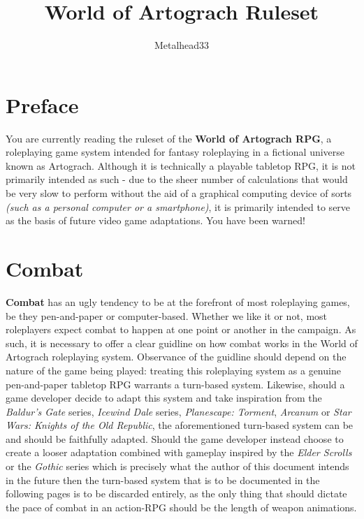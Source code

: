 \documentclass[openany,11pt,a4paper]{book}
\author{Metalhead33}
\title{World of Artograch Ruleset}
\begin{document}
\maketitle
\tableofcontents
\chapter*{Preface}
You are currently reading the ruleset of the \textbf{World of Artograch RPG}, a roleplaying game system intended for fantasy roleplaying in a fictional universe known as Artograch. Although it is technically a playable tabletop RPG, it is not primarily intended as such - due to the sheer number of calculations that would be very slow to perform without the aid of a graphical computing device of sorts \textit{(such as a personal computer or a smartphone)}, it is primarily intended to serve as the basis of future video game adaptations. You have been warned!\newline
\chapter{Combat}
\textbf{Combat} has an ugly tendency to be at the forefront of most roleplaying games, be they pen-and-paper or computer-based. Whether we like it or not, most roleplayers expect combat to happen at one point or another in the campaign. As such, it is necessary to offer a clear guidline on how combat works in the World of Artograch roleplaying system.\newline
Observance of the guidline should depend on the nature of the game being played: treating this roleplaying system as a genuine pen-and-paper tabletop RPG warrants a turn-based system. Likewise, should a game developer decide to adapt this system and take inspiration from the \textit{Baldur's Gate} series, \textit{Icewind Dale} series, \textit{Planescape: Torment}, \textit{Arcanum} or \textit{Star Wars: Knights of the Old Republic}, the aforementioned turn-based system can be and should be faithfully adapted. Should the game developer instead choose to create a looser adaptation combined with gameplay inspired by the \textit{Elder Scrolls} or the \textit{Gothic} series \textemdash which is precisely what the author of this document intends in the future \textemdash then the turn-based system that is to be documented in the following pages is to be discarded entirely, as the only thing that should dictate the pace of combat in an action-RPG should be the length of weapon animations.
\end{document}
